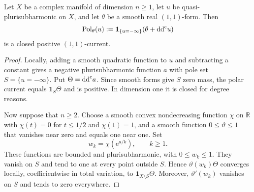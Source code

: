 \begin{proposition}\label{prop:polar-curvature-closedness}
Let $X$ be a complex manifold of dimension $n\geq1$, let $u$ be quasi-plurisubharmonic on $X$, and let $\theta$ be a smooth real $(1,1)$-form. Then
\[
 \operatorname{Pol}_\theta(u)
       :=\mathbf1_{\{u=-\infty\}}(\theta+\mathrm{dd}^{\mathrm{c}} u)
\]
is a closed positive $(1,1)$-current.
\end{proposition}
\begin{proof}
Locally, adding a smooth quadratic function to $u$ and subtracting a constant gives a negative plurisubharmonic function $a$ with pole set $S=\{u=-\infty\}$. Put $\Theta=\mathrm{dd}^{\mathrm{c}} a$. Since smooth forms give $S$ zero mass, the polar current equals $\mathbf1_S\Theta$ and is positive. In dimension one it is closed for degree reasons.

Now suppose that $n\geq2$. Choose a smooth convex nondecreasing function $\chi$ on $\mathbb R$ with $\chi(t)=0$ for $t\leq1/2$ and $\chi(1)=1$, and a smooth function $0\leq\vartheta\leq1$ that vanishes near zero and equals one near one. Set
\[
 w_k=\chi(\mathrm{e}^{a/k}),\qquad k\geq1.
\]
These functions are bounded and plurisubharmonic, with $0\leq w_k\leq1$. They vanish on $S$ and tend to one at every point outside $S$. Hence $\vartheta(w_k)\Theta$ converges locally, coefficientwise in total variation, to $\mathbf1_{X\setminus S}\Theta$. Moreover, $\vartheta'(w_k)$ vanishes on $S$ and tends to zero everywhere.


\end{proof}
